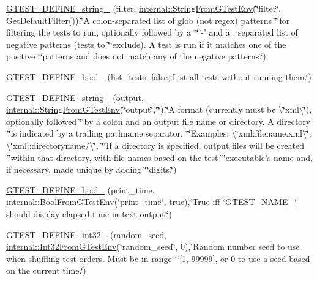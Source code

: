 \begin{DoxyCompactItemize}
\item 
\hyperlink{namespacetesting_aa7039e72c7b7041f11d2619c93a934d6}{G\-T\-E\-S\-T\-\_\-\-D\-E\-F\-I\-N\-E\-\_\-string\-\_\-} (filter, \hyperlink{namespacetesting_1_1internal_a0967cbf18fb1594f82512d8d822aba21}{internal\-::\-String\-From\-G\-Test\-Env}(\char`\"{}filter\char`\"{}, Get\-Default\-Filter()),\char`\"{}A colon-\/separated list of glob (not regex) patterns \char`\"{}\char`\"{}for filtering the tests to run, optionally followed by a \char`\"{}\char`\"{}'-\/' and a \-: separated list of negative patterns (tests to \char`\"{}\char`\"{}exclude).  A test is run if it matches one of the positive \char`\"{}\char`\"{}patterns and does not match any of the negative patterns.\char`\"{})
\item 
\hyperlink{namespacetesting_a9ef54a5b29ac4b2a1e086e77224a0b19}{G\-T\-E\-S\-T\-\_\-\-D\-E\-F\-I\-N\-E\-\_\-bool\-\_\-} (list\-\_\-tests, false,\char`\"{}List all tests without running them.\char`\"{})
\item 
\hyperlink{namespacetesting_a9f8de43b364103bafa1e8ca4bebe9d58}{G\-T\-E\-S\-T\-\_\-\-D\-E\-F\-I\-N\-E\-\_\-string\-\_\-} (output, \hyperlink{namespacetesting_1_1internal_a0967cbf18fb1594f82512d8d822aba21}{internal\-::\-String\-From\-G\-Test\-Env}(\char`\"{}output\char`\"{},\char`\"{}\char`\"{}),\char`\"{}A format (currently must be \textbackslash{}\char`\"{}xml\textbackslash{}\char`\"{}), optionally followed \char`\"{}\char`\"{}by a colon and an output file name or directory. A directory \char`\"{}\char`\"{}is indicated by a trailing pathname separator. \char`\"{}\char`\"{}Examples\-: \textbackslash{}\char`\"{}xml\-:filename.\-xml\textbackslash{}\char`\"{}, \textbackslash{}\char`\"{}xml\-::directoryname/\textbackslash{}\char`\"{}. \char`\"{}\char`\"{}If a directory is specified, output files will be created \char`\"{}\char`\"{}within that directory, with file-\/names based on the test \char`\"{}\char`\"{}executable's name and, if necessary, made unique by adding \char`\"{}\char`\"{}digits.\char`\"{})
\item 
\hyperlink{namespacetesting_a51fb68302e8e3fce5bd61340843a6e6a}{G\-T\-E\-S\-T\-\_\-\-D\-E\-F\-I\-N\-E\-\_\-bool\-\_\-} (print\-\_\-time, \hyperlink{namespacetesting_1_1internal_a1055088bb9b867e1b7b8f096f519d7c5}{internal\-::\-Bool\-From\-G\-Test\-Env}(\char`\"{}print\-\_\-time\char`\"{}, true),\char`\"{}True iff \char`\"{}G\-T\-E\-S\-T\-\_\-\-N\-A\-M\-E\-\_\-\char`\"{} should display elapsed time in text output.\char`\"{})
\item 
\hyperlink{namespacetesting_a25e098abb7ce93d06582d48434be90c7}{G\-T\-E\-S\-T\-\_\-\-D\-E\-F\-I\-N\-E\-\_\-int32\-\_\-} (random\-\_\-seed, \hyperlink{namespacetesting_1_1internal_ac2ea500678b361ecd2c03e4b02bb2ccf}{internal\-::\-Int32\-From\-G\-Test\-Env}(\char`\"{}random\-\_\-seed\char`\"{}, 0),\char`\"{}Random number seed to use when shuffling test orders.  Must be in range \char`\"{}\char`\"{}\mbox{[}1, 99999\mbox{]}, or 0 to use a seed based on the current time.\char`\"{})

\end{DoxyCompactItemize}
